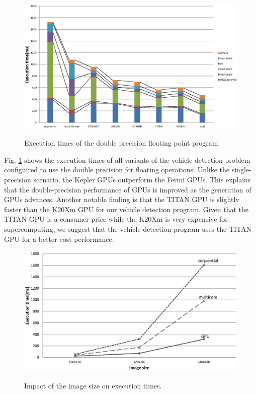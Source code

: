 \begin{figure}[t]
 \begin{center}
  \includegraphics[width=\hsize]{fig/double_exe_time.eps}\\
  \caption{Execution times of the double precision floating point program.}
  \label{fig:double_exe_time}
 \end{center}
\end{figure}

Fig. \ref{fig:double_exe_time} shows the execution times of all variants
of the vehicle detection problem configuired to use the double precision
for floating operations.
Unlike the single-precision scenario, the Kepler GPUs outperform the
Fermi GPUs.
This explains that the double-precision performance of GPUs is improved
as the generation of GPUs advances.
Another notable finding is that the TITAN GPU is slightly faster than
the K20Xm GPU for our vehicle detection program.
Given that the TITAN GPU is a consumer price while the K20Xm is very
expensive for supercomputing, we suggest that the vehicle detection
program uses the TITAN GPU for a better cost performance.

\begin{figure}[t]
 \begin{center}
  \includegraphics[width=\hsize]{fig/time_on_image_size.eps}\\
  \caption{Impact of the image size on execution times.}
  \label{fig:time_on_image_size}
 \end{center}
\end{figure}

